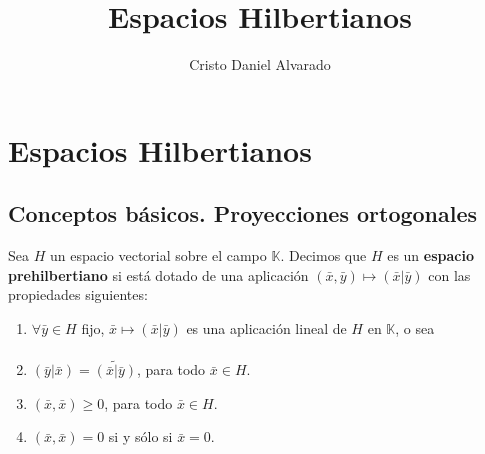 \documentclass[12pt]{report}
\theoremstyle{largebreak}
\begin{document}
    \title{Espacios Hilbertianos}
    \author{Cristo Daniel Alvarado}
    \maketitle

    \tableofcontents %

    \setcounter{chapter}{0} %
    
    \chapter{Espacios Hilbertianos}
    

    \section{Conceptos básicos. Proyecciones ortogonales}

    \begin{mydef}
        Sea $H$ un espacio vectorial sobre el campo $\mathbb{K}$. Decimos que $H$ es un \textbf{espacio prehilbertiano} si está dotado de una aplicación $(\bar{x},\bar{y})\mapsto (\bar{x}\big| \bar{y})$ con las propiedades siguientes:
        \begin{enumerate}
            \item $\forall \bar{y}\in H$ fijo, $\bar{x}\mapsto (\bar{x}\big| \bar{y})$ es una aplicación lineal de $H$ en $\mathbb{K}$, o sea
            \begin{equation*}
                \begin{split}
                \end{split}
            \end{equation*}
            \item $(\bar{y}\big| \bar{x})=\widetilde{(\bar{x} \big| \bar{y})}$, para todo $\bar{x}\in H$.
            \item $(\bar{x},\bar{x})\geq0$, para todo $\bar{x}\in H$.
            \item $(\bar{x},\bar{x})=0$ si y sólo si $\bar{x}=0$.
        \end{enumerate}
    \end{mydef}
\end{document}

